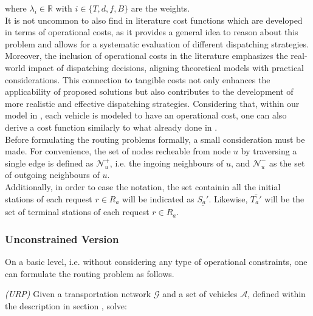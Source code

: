 where $\lambda_i \in \mathbb{R}$ with $i \in \{T, d,f, B\}$ are the weights.\\
It is not uncommon to also find in literature cost functions which are developed in terms of operational costs, as it provides a general idea to reason about this problem and allows for a systematic evaluation of different dispatching strategies. Moreover, the inclusion of operational costs in the literature emphasizes the real-world impact of dispatching decisions, aligning theoretical models with practical considerations. This connection to tangible costs not only enhances the applicability of proposed solutions but also contributes to the development of more realistic and effective dispatching strategies. Considering that, within our model in , each vehicle is modeled to have an operational cost, one can also derive a cost function similarly to what already done in \cite{project_thesis}. \\
Before formulating the routing problems formally, a small consideration must be made. For convenience, the set of nodes recheable from node $u$ by traversing a single edge is defined as $\mathcal{N}^+_u$, i.e. the ingoing neighbours of $u$, and $\mathcal{N}^-_u$ as the set of outgoing neighbours of $u$.\\ Additionally, in order to ease the notation, the set containin all the initial stations of each request $r \in R_a$ will be indicated as $\underline{S_a'}$. Likewise,  $\bar{T_a'}$ will be the set of terminal stations of each request $r \in R_a$. \\
\subsubsection*{Unconstrained Version}
On a basic level, i.e. without considering any type of operational constraints, one can formulate the routing problem as follows. \\
\begin{algori}{\textit{(URP)}}
	Given a transportation network $\mathcal{G}$ and a set of vehicles $\mathcal{A}$, defined within the description in section , solve:
\end{algori}


